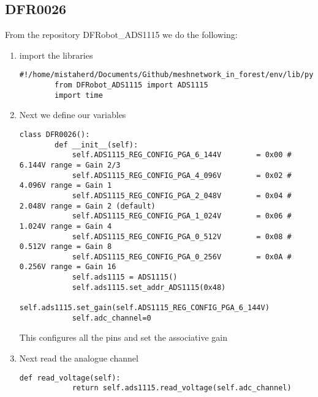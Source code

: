 \subsection{DFR0026}
\label{ADC section}
From the repository DFRobot_ADS1115 we do the following:
\begin{enumerate}
    \item import the libraries
    \begin{lstlisting}[style=mystyle]
        #!/home/mistaherd/Documents/Github/meshnetwork_in_forest/env/lib/python3.11
        from DFRobot_ADS1115 import ADS1115
        import time
    \end{lstlisting}
    \item Next we define our variables
    \begin{lstlisting}[style=mystyle]
    class DFR0026():
        def __init__(self):
            self.ADS1115_REG_CONFIG_PGA_6_144V        = 0x00 # 6.144V range = Gain 2/3
            self.ADS1115_REG_CONFIG_PGA_4_096V        = 0x02 # 4.096V range = Gain 1
            self.ADS1115_REG_CONFIG_PGA_2_048V        = 0x04 # 2.048V range = Gain 2 (default)
            self.ADS1115_REG_CONFIG_PGA_1_024V        = 0x06 # 1.024V range = Gain 4
            self.ADS1115_REG_CONFIG_PGA_0_512V        = 0x08 # 0.512V range = Gain 8
            self.ADS1115_REG_CONFIG_PGA_0_256V        = 0x0A # 0.256V range = Gain 16
            self.ads1115 = ADS1115()
            self.ads1115.set_addr_ADS1115(0x48)
            self.ads1115.set_gain(self.ADS1115_REG_CONFIG_PGA_6_144V)
            self.adc_channel=0
    \end{lstlisting}
    This configures all the pins  and set the associative gain
    \item Next read the analogue channel
    \begin{lstlisting}[style=mystyle]
        def read_voltage(self):
            return self.ads1115.read_voltage(self.adc_channel)
    \end{lstlisting}
\end{enumerate}
\newpage
